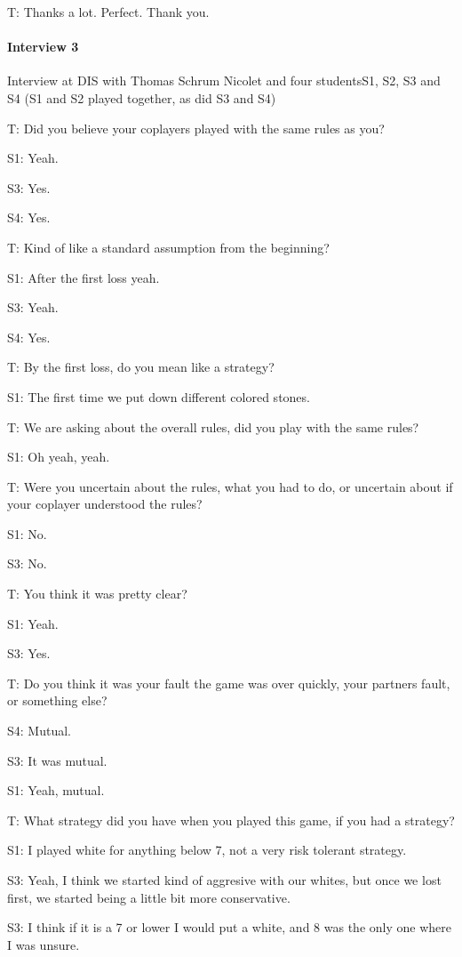 T: Thanks a lot. Perfect. Thank you.


\bigskip
\paragraph{Interview 3}
Interview at DIS with Thomas Schrum Nicolet and four studentsS1, S2, S3 and S4 (S1 and S2 played together, as did S3 and S4)

\medskip
T: Did you believe your coplayers played with the same rules as you?

S1: Yeah.

S3: Yes.

S4: Yes.

T: Kind of like a standard assumption from the beginning?

S1: After the first loss yeah.

S3: Yeah.

S4: Yes.

T: By the first loss, do you mean like a strategy?

S1: The first time we put down different colored stones.

T: We are asking about the overall rules, did you play with the same rules?

S1: Oh yeah, yeah.

T: Were you uncertain about the rules, what you had to do, or uncertain about if your coplayer understood the rules?

S1: No.

S3: No.

T: You think it was pretty clear?

S1: Yeah.

S3: Yes.

T: Do you think it was your fault the game was over quickly, your partners fault, or something else?

S4: Mutual.

S3: It was mutual.

S1: Yeah, mutual.

T: What strategy did you have when you played this game, if you had a strategy?

S1: I played white for anything below 7, not a very risk tolerant strategy.

S3: Yeah, I think we started kind of aggresive with our whites, but once we lost first, we started being a little bit more conservative.

S3: I think if it is a 7 or lower I would put a white, and 8 was the only one where I was unsure.

